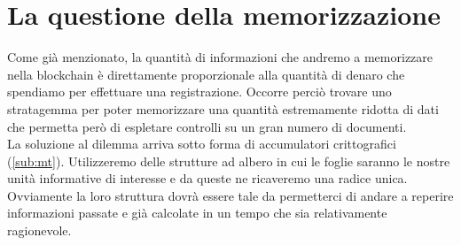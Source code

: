 \section{La questione della memorizzazione}

Come già menzionato, la quantità di informazioni che andremo a memorizzare
nella blockchain è direttamente proporzionale alla quantità di denaro che
spendiamo per effettuare una registrazione.
Occorre perciò trovare uno stratagemma per poter memorizzare una quantità
estremamente ridotta di dati che permetta però di espletare controlli su un gran numero
di documenti. \\
La soluzione al dilemma arriva sotto forma di accumulatori crittografici (\autoref{sub:mt}).
Utilizzeremo delle strutture ad albero in cui le foglie saranno le nostre unità
informative di interesse e da queste ne ricaveremo una radice unica.
Ovviamente la loro struttura dovrà essere tale da permetterci di andare a reperire
informazioni passate e già calcolate in un tempo che sia relativamente ragionevole.

\newpage